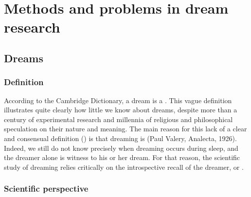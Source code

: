 \cleardoublepage

\chapter{Methods and problems in dream research}
\label{sec:dream-research}


\section{Dreams}
\label{sec:dream-research:dreams}

\subsection{Definition}
\label{sec:dream-research:dreams:definition}

According to the Cambridge Dictionary, a dream is a . This vague definition illustrates quite clearly how little we know about dreams, despite more than a century of experimental research and millennia of religious and philosophical speculation on their nature and meaning. The main reason for this lack of a clear and consensual definition (\cite{pagel_definitions_2001}) is that dreaming is  (Paul Valery, Analecta, 1926).  Indeed, we still do not know precisely when dreaming occurs during sleep, and the dreamer alone is witness to his or her dream. For that reason, the scientific study of dreaming relies critically on the introspective recall of the dreamer, or  \citep{schwartz_dreaming:_2005}.

\subsection{Scientific perspective}
\label{sec:dream-research:dreams:science}

